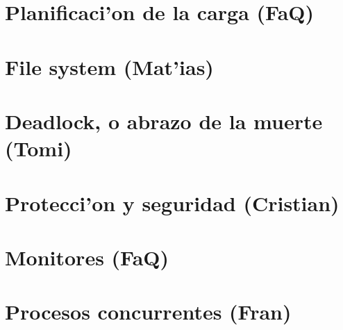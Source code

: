 \documentclass[a4paper,11pt, spanish]{article}
\begin{document}
\tableofcontents
\newpage
\section{Planificaci'on de la carga (FaQ)}
%

\section{File system (Mat'ias)}


\section{Deadlock, o abrazo de la muerte (Tomi)}


\section{Protecci'on y seguridad (Cristian)}


\section{Monitores (FaQ)}
%

\section{Procesos concurrentes (Fran)}
%
\end{document}
